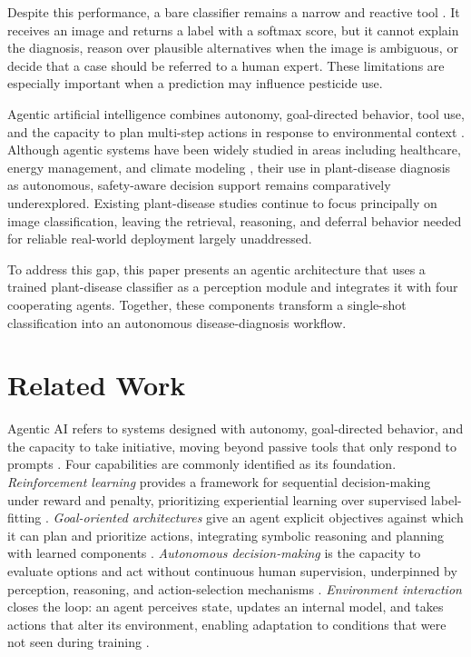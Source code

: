 \documentclass[conference]{IEEEtran}
\begin{document}
Despite this performance, a bare classifier remains a narrow and reactive tool \cite{b1}. It receives an image and returns a label with a softmax score, but it cannot explain the diagnosis, reason over plausible alternatives when the image is ambiguous, or decide that a case should be referred to a human expert. These limitations are especially important when a prediction may influence pesticide use. 

Agentic artificial intelligence combines autonomy, goal-directed behavior, tool use, and the capacity to plan multi-step actions in response to environmental context \cite{b1,b3}. Although agentic systems have been widely studied in areas including healthcare, energy management, and climate modeling \cite{b2}, their use in plant-disease diagnosis as autonomous, safety-aware decision support remains comparatively underexplored. Existing plant-disease studies continue to focus principally on image classification, leaving the retrieval, reasoning, and deferral behavior needed for reliable real-world deployment largely unaddressed.

To address this gap, this paper presents an agentic architecture that uses a trained plant-disease classifier as a perception module and integrates it with four cooperating agents. Together, these components transform a single-shot classification into an autonomous disease-diagnosis workflow. 

\section{Related Work}
\label{sec:related}

Agentic AI refers to systems designed with autonomy, goal-directed behavior, and the capacity to take initiative, moving beyond passive tools that only respond to prompts \cite{b1}. Four capabilities are commonly identified as its foundation. \emph{Reinforcement learning} provides a framework for sequential decision-making under reward and penalty, prioritizing experiential learning over supervised label-fitting \cite{r1}. \emph{Goal-oriented architectures} give an agent explicit objectives against which it can plan and prioritize actions, integrating symbolic reasoning and planning with learned components \cite{r2}. \emph{Autonomous decision-making} is the capacity to evaluate options and act without continuous human supervision, underpinned by perception, reasoning, and action-selection mechanisms \cite{b12}. \emph{Environment interaction} closes the loop: an agent perceives state, updates an internal model, and takes actions that alter its environment, enabling adaptation to conditions that were not seen during training \cite{b4}.
\end{document}
